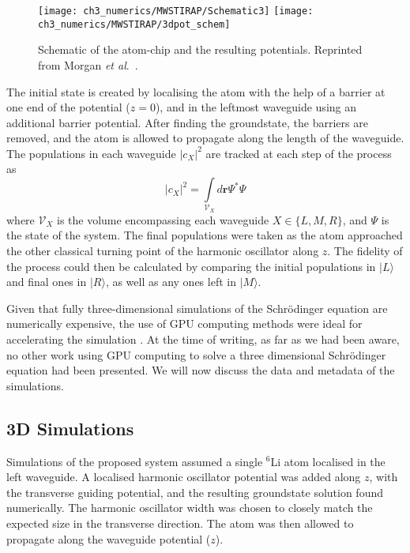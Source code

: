 \begin{figure}[tb]
    \centering
  \texttt{[image: ch3\_numerics/MWSTIRAP/Schematic3]}
  \texttt{[image: ch3\_numerics/MWSTIRAP/3dpot\_schem]}
  \caption{Schematic of the atom-chip and the resulting potentials. Reprinted from Morgan {\textit{et al}.}~\cite{AO:Morgan_pra_2013}.}
  \label{fig:schematic_atom-chip}
\end{figure}

The initial state is created by localising the atom with the help of a barrier at one end of the potential ($z=0$), and in the leftmost waveguide using an additional barrier potential. After finding the groundstate, the barriers are removed, and the atom is allowed to propagate along the length of the waveguide. The populations in each waveguide $|c_{X}|^2$ are tracked at each step of the process as
\begin{equation}
    |c_X|^2 = \int\limits_{\mathcal{V}_X} d\mathbf{r}  \Psi^{*} \Psi
\end{equation}
where $\mathcal{V}_X$ is the volume encompassing each waveguide $X \in \{L,M,R\}$, and $\Psi$ is the state of the system.
The final populations were taken as the atom approached the other classical turning point of the harmonic oscillator along $z$. The fidelity of the process could then be calculated by comparing the initial populations in $| L \rangle$ and final ones in $|R \rangle$, as well as any ones left in $| M \rangle$.

Given that fully three-dimensional simulations of the Schr\"odinger equation are numerically expensive, the use of GPU computing methods were ideal for accelerating the simulation \cite{Num:Bauke_cpc_2011}. At the time of writing, as far as we had been aware, no other work using GPU computing to solve a three dimensional Schr\"odinger equation had been presented. We will now discuss the data and metadata of the simulations.

\subsection{3D Simulations}
\label{sec:Results}

Simulations of the proposed system assumed a single $^{6}$Li atom localised in the left waveguide. A localised harmonic oscillator potential was added along $z$, with the transverse guiding potential, and the resulting groundstate solution found numerically. The harmonic oscillator width was chosen to closely match the expected size in the transverse direction. The atom was then allowed to propagate along the waveguide potential ($z$).

